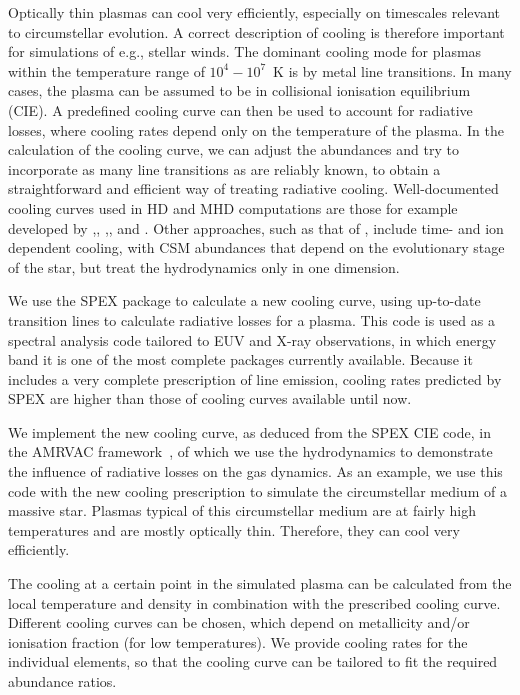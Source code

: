 \documentclass[floatfix,traditabstract,preprint2]{aa}
\begin{document}
Optically thin plasmas can cool very efficiently, especially on timescales relevant to circumstellar evolution. A correct description of cooling is therefore important for simulations of e.g., stellar winds. The dominant cooling mode for plasmas within the temperature range of $10^4-10^7$~K is by metal line transitions. In many cases, the plasma can be assumed to be in collisional ionisation equilibrium (CIE). A predefined cooling curve can then be used to account for radiative losses, where cooling rates depend only on the temperature of the plasma. In the calculation of the cooling curve, we can adjust the abundances and try to incorporate as many line transitions as are reliably known, to obtain a straightforward and efficient way of treating radiative cooling. 
Well-documented cooling curves used in HD and MHD computations are those for example developed by \citet{1972DalgarnoMcCray},\citet{1977RaymondSmith}, \citet{1981MacDonaldBailey},\citet{1993SutherlandDopita}, and \citet{2008Smithetal}. Other approaches, such as that of \cite{2002MellemaLundqvist}, include time- and ion dependent cooling, with CSM abundances that depend on the evolutionary stage of the star, but treat the hydrodynamics only in one dimension.

We use the SPEX package \citep{1996Kaastraetal} to calculate a new cooling curve, using up-to-date transition lines to calculate radiative losses for a plasma. This code is used as a spectral analysis code tailored to EUV and X-ray observations, in which energy band it is one of the most complete packages currently available. Because it includes a very complete prescription of line emission, cooling rates predicted by SPEX are higher than those of cooling curves available until now. 

We implement the new cooling curve, as deduced from the SPEX CIE code, in the AMRVAC framework~\citep{2003Keppensetal}, of which we use the hydrodynamics to demonstrate the influence of radiative losses on the gas dynamics. As an example, we use this code with the new cooling prescription to simulate the circumstellar medium of a massive star. 
Plasmas typical of this circumstellar medium are at fairly high temperatures and are mostly optically thin. Therefore, they can cool very efficiently. 

The cooling at a certain point in the simulated plasma can be calculated from the local temperature and density in combination with the prescribed cooling curve. Different cooling curves can be chosen, which depend on metallicity and/or ionisation fraction (for low temperatures). We provide cooling rates for the individual elements, so that the cooling curve can be tailored to fit the required abundance ratios. 
\end{document}
